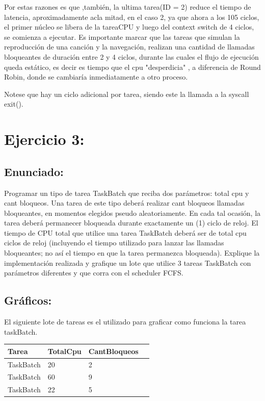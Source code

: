\documentclass[10pt, a4paper]{article}
\begin{document}
Por estas razones es que ,también, la ultima tarea(ID = 2) reduce el tiempo de latencia, aproximadamente acla mitad, en el caso 2, ya que ahora a los 105 ciclos, el primer núcleo se libera de la tareaCPU y luego del context switch de 4 ciclos, se comienza a ejecutar.
Es importante marcar que las tareas que simulan la reproducción de una canción y la navegación, realizan una cantidad de llamadas bloqueantes de duración entre 2 y 4 ciclos, durante las cuales el flujo de ejecución queda estático, es decir es tiempo que el cpu "desperdicia" , a diferencia de Round Robin, donde se cambiaría inmediatamente a otro proceso.

Notese que hay un ciclo adicional por tarea, siendo este la llamada a la syscall exit().
\section{Ejercicio 3:}

\subsection{Enunciado:}

Programar un tipo de tarea TaskBatch que reciba dos parámetros: total cpu y
cant bloqueos. Una tarea de este tipo deberá realizar cant bloqueos llamadas bloqueantes, en
momentos elegidos pseudo aleatoriamente. En cada tal ocasión, la tarea deberá permanecer
bloqueada durante exactamente un (1) ciclo de reloj. El tiempo de CPU total que utilice una
tarea TaskBatch deberá ser de total cpu ciclos de reloj (incluyendo el tiempo utilizado para
lanzar las llamadas bloqueantes; no así el tiempo en que la tarea permanezca bloqueada).
Explique la implementación realizada y grafique un lote que utilice 3 tareas TaskBatch con
parámetros diferentes y que corra con el scheduler FCFS.
\subsection{Gráficos:}

El siguiente lote de tareas es el utilizado para graficar como funciona la tarea taskBatch.

\begin{center}
\begin{tabular}{| l | l | l | l |}
    \hline
   Tarea & TotalCpu & CantBloqueos \\ \hline
  TaskBatch & 20 & 2 \\ \hline
TaskBatch & 60 & 9 \\ \hline
TaskBatch & 22 & 5 \\ \hline

\end{tabular}
\end{center}
\end{document}
